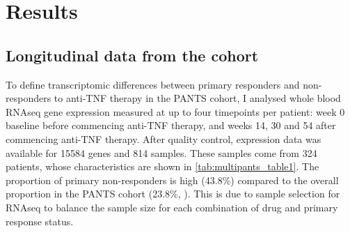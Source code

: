 
\section{Results}

\subsection{Longitudinal  data from the  cohort}

To define transcriptomic differences between primary responders and non-responders to anti-\gls{TNF} therapy in the \gls{PANTS} cohort, 
I analysed whole blood \gls{RNAseq} gene expression measured at up to four timepoints per patient:
week 0 baseline before commencing anti-\gls{TNF} therapy, and weeks 14, 30 and 54 after commencing anti-\gls{TNF} therapy.
After quality control, expression data was available for 15584 genes and 814 samples.
These samples come from 324 patients, whose characteristics are shown in \cref{tab:multipants_table1}.
The proportion of primary non-responders is high (43.8\%) compared to the overall proportion in the \gls{PANTS} cohort (23.8\%, \autocite{kennedy2019PredictorsAntiTNFTreatment}).
This is due to sample selection for \gls{RNAseq} to balance the sample size for each combination of drug and primary response status.

